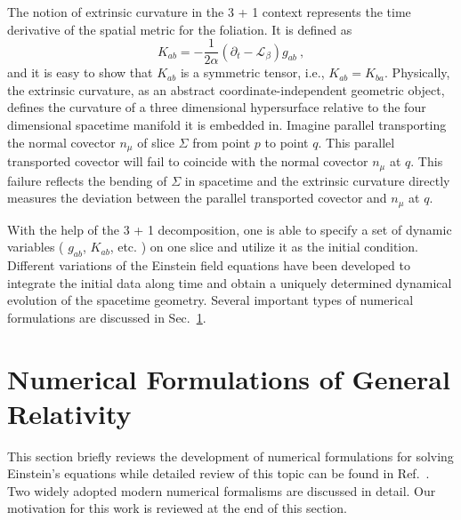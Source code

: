 The notion of extrinsic curvature in the 3 + 1 context represents the time derivative of the spatial metric for the foliation. It is defined as
\begin{equation}\label{extrinsic}
K_{ab} = - \frac{1}{2\alpha}(\partial_{t} - \mathcal{L}_{\beta})g_{ab} \ ,
\end{equation}
and it is easy to show that $K_{ab}$ is a symmetric tensor, i.e., $K_{ab} = K_{ba}$. Physically, the extrinsic curvature, as an abstract coordinate-independent geometric object, defines the curvature of a three dimensional hypersurface relative to the four dimensional spacetime manifold it is embedded in. Imagine parallel transporting the normal covector $n_{\mu}$ of slice $\Sigma$ from point $p$ to point $q$. This parallel transported covector will fail to coincide with the normal covector $n_{\mu}$ at $q$. This failure reflects the bending of $\Sigma$ in spacetime and the extrinsic curvature directly measures the deviation between the parallel transported covector and $n_{\mu}$ at $q$. 

With the help of the 3 + 1 decomposition, one is able to specify a set of dynamic variables ( $g_{ab}$, $K_{ab}$, etc. ) on one slice and utilize it as the initial condition. Different variations of the Einstein field equations have been developed to integrate the initial data along time and obtain a uniquely determined dynamical evolution of the spacetime geometry. Several important types of  numerical formulations are discussed in Sec.~\ref{numericalformulation}.  

\section{Numerical Formulations of General Relativity}\label{numericalformulation}
This section briefly reviews the development of numerical formulations for solving Einstein's equations while detailed review of this topic can be found in Ref.~\cite{lrr-2012-9}. Two widely adopted modern numerical formalisms are discussed in detail. Our motivation for this work is reviewed at the end of this section. 

